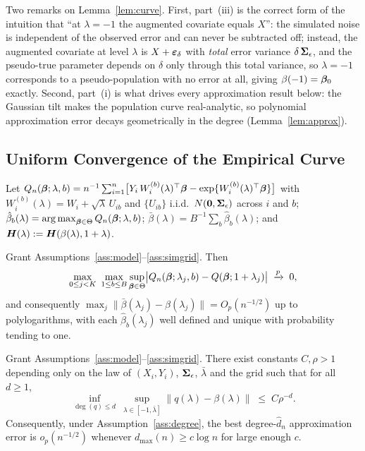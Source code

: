 Two remarks on Lemma~\ref{lem:curve}. First, part~(iii) is the correct
form of the intuition that ``at $\lambda=-1$ the augmented covariate
equals $X$'': the simulated noise is independent of the observed error
and can never be subtracted off; instead, the augmented covariate at
level $\lambda$ is $X+\bm{\varepsilon}_\delta$ with \emph{total} error variance
$\delta\,\bm{\Sigma}_\epsilon$, and the pseudo-true parameter depends on
$\delta$ only through this total variance, so $\lambda=-1$
corresponds to a pseudo-population with no error at all, giving
$\beta(-1)=\bm{\beta}_0$ exactly. Second, part~(i) is what drives every
approximation result below: the Gaussian tilt makes the population
curve real-analytic, so polynomial approximation error decays
geometrically in the degree (Lemma~\ref{lem:approx}).

\subsection{Uniform Convergence of the Empirical Curve}\label{sec:unif}

Let
$Q_n(\bm{\beta};\lambda,b)=n^{-1}\sum_{i=1}^n\bigl[
Y_i\,W_i^{(b)}(\lambda)^\top\bm{\beta}
-\exp\{W_i^{(b)}(\lambda)^\top\bm{\beta}\}\bigr]$ with
$W_i^{(b)}(\lambda)=W_i+\sqrt\lambda\,U_{ib}$ and
$\{U_{ib}\}$ i.i.d.\ $N(\bm 0,\bm{\Sigma}_\epsilon)$ across $i$ and $b$;
$\hat\beta_b(\lambda)=\operatorname*{arg\,max}_{\bm{\beta}\in\Theta}Q_n(\bm{\beta};\lambda,b)$;
$\bar\beta(\lambda)=B^{-1}\sum_b\hat\beta_b(\lambda)$; and
$\bm H(\lambda):=\bm{H}(\beta(\lambda),1+\lambda)$.

\begin{lemma}\label{lem:unif}
Grant Assumptions~\ref{ass:model}--\ref{ass:simgrid}. Then
\[
  \max_{0\le j<K}\ \max_{1\le b\le B}
  \sup_{\bm{\beta}\in\Theta}\bigl|Q_n(\bm{\beta};\lambda_j,b)-Q(\bm{\beta};1+\lambda_j)\bigr|
  \;\xrightarrow{p}\;0,
\]
and consequently
$\max_{j}\|\bar\beta(\lambda_j)-\beta(\lambda_j)\|
=O_p(n^{-1/2})$ up to polylogarithms, with each
$\hat\beta_b(\lambda_j)$ well defined and unique with probability
tending to one.
\end{lemma}

\begin{lemma}\label{lem:approx}
Grant Assumptions~\ref{ass:model}--\ref{ass:simgrid}. There exist
constants $C,\rho>1$ depending only on the law of $(X_i,Y_i)$,
$\bm{\Sigma}_\epsilon$, $\bar\lambda$ and the grid such that for all $d\ge1$,
\[
  \inf_{\deg(q)\le d}\ \sup_{\lambda\in[-1,\bar\lambda]}
  \bigl\|q(\lambda)-\beta(\lambda)\bigr\|
  \;\le\;C\rho^{-d}.
\]
Consequently, under Assumption~\ref{ass:degree}, the best
degree-$\hat d_n$ approximation error is $o_p(n^{-1/2})$ whenever
$d_{\max}(n)\ge c\log n$ for large enough $c$.
\end{lemma}


